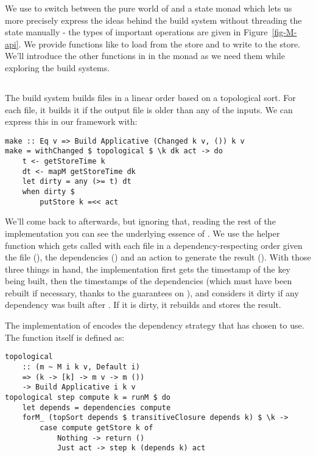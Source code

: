 We use  to switch between the pure world of  and a state monad  which lets us more precisely express the ideas behind the build system without threading the state manually - the types of important operations are given in Figure~\ref{fig-M-api}. We provide functions like  to load from the store and  to write to the store. We'll introduce the other functions in in the monad  as we need them while exploring the build systems.

\subsection{\Make}\label{sec-implementation-make}

The \Make build system builds files in a linear order based on a topological sort. For each file, it builds it if the output file is older than any of the inputs. We can express this in our framework with:

\begin{verbatim}
make :: Eq v => Build Applicative (Changed k v, ()) k v
make = withChanged $ topological $ \k dk act -> do
    t <- getStoreTime k
    dt <- mapM getStoreTime dk
    let dirty = any (>= t) dt
    when dirty $
        putStore k =<< act
\end{verbatim}

We'll come back to  afterwards, but ignoring that, reading the rest of the implementation you can see the underlying essence of \Make. We use the helper function  which gets called with each file in a dependency-respecting order given the file (), the dependencies () and an action to generate the result (). With those three things in hand, the implementation first gets the timestamp of the key being built, then the timestamps of the dependencies (which must have been rebuilt if necessary, thanks to the guarantees on ), and considers it dirty if any dependency was built after . If it is dirty, it rebuilds and stores the result.

The implementation of  encodes the dependency strategy that \Make has chosen to use. The function itself is defined as:

\begin{verbatim}
topological
    :: (m ~ M i k v, Default i)
    => (k -> [k] -> m v -> m ())
    -> Build Applicative i k v
topological step compute k = runM $ do
    let depends = dependencies compute
    forM_ (topSort depends $ transitiveClosure depends k) $ \k ->
        case compute getStore k of
            Nothing -> return ()
            Just act -> step k (depends k) act
\end{verbatim}

